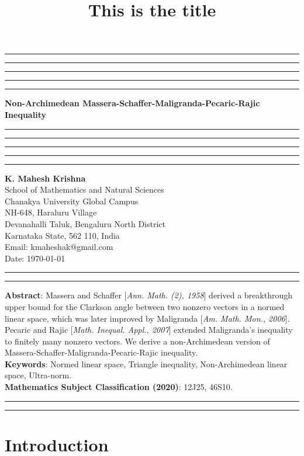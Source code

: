 \documentclass{amsart}
\title{This is the title}
\begin{document}
\hrule\hrule\hrule\hrule\hrule
\vspace{0.3cm}	
\begin{center}
{\bf\large{{Non-Archimedean Massera-Schaffer-Maligranda-Pecaric-Rajic Inequality}}}\\
\vspace{0.3cm}
\hrule\hrule\hrule\hrule\hrule
\vspace{0.3cm}
\textbf{K. Mahesh Krishna}\\
School of Mathematics and Natural Sciences\\
Chanakya University Global Campus\\
NH-648, Haraluru Village\\
Devanahalli Taluk, 	Bengaluru  North District\\
Karnataka State, 562 110, India\\
Email: kmaheshak@gmail.com\\

Date: \today
\end{center}

\hrule\hrule
\vspace{0.5cm}
\textbf{Abstract}: Massera and Schaffer [\textit{Ann. Math. (2), 1958}] derived a breakthrough upper bound for the Clarkson angle between two nonzero vectors in a normed linear space, which was later improved by Maligranda [\textit{Am. Math. Mon., 2006}]. Pecaric and Rajic [\textit{Math. Inequal. Appl., 2007}] extended Maligranda's inequality to finitely many nonzero vectors. We derive a non-Archimedean version of  Massera-Schaffer-Maligranda-Pecaric-Rajic inequality.
 \\
\textbf{Keywords}:  Normed linear space, Triangle inequality, Non-Archimedean linear space, Ultra-norm.\\
\textbf{Mathematics Subject Classification (2020)}:  12J25, 46S10.\\

\hrule


\hrule
\section{Introduction}
\end{document}
